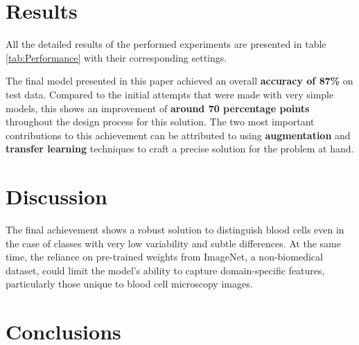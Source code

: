 \documentclass[11pt]{article}
\begin{document}
\begin{multicols}{2}
        
    \section{Results}

        All the detailed results of the performed experiments are presented in table \ref{tab:Performance} with their corresponding settings. 
        
		The final model presented in this paper achieved an overall \textbf{accuracy of 87\%}
        on test data. Compared to the initial attempts that were made with very simple models, this shows an improvement of \textbf{around 70 percentage points} throughout the design process for this solution. The two most important contributions to this achievement can be attributed to using \textbf{augmentation} and \textbf{transfer learning} techniques to craft a precise solution for the problem at hand.

         
        
    \section{Discussion}
        The final achievement shows a robust solution to distinguish blood cells even in the case of classes with very low variability and subtle differences. At the same time, the reliance on pre-trained weights from ImageNet, a non-biomedical dataset, could limit the model's ability to capture domain-specific features, particularly those unique to blood cell microscopy images. 

        
    \section{Conclusions}
    

\end{multicols}
\end{document}
